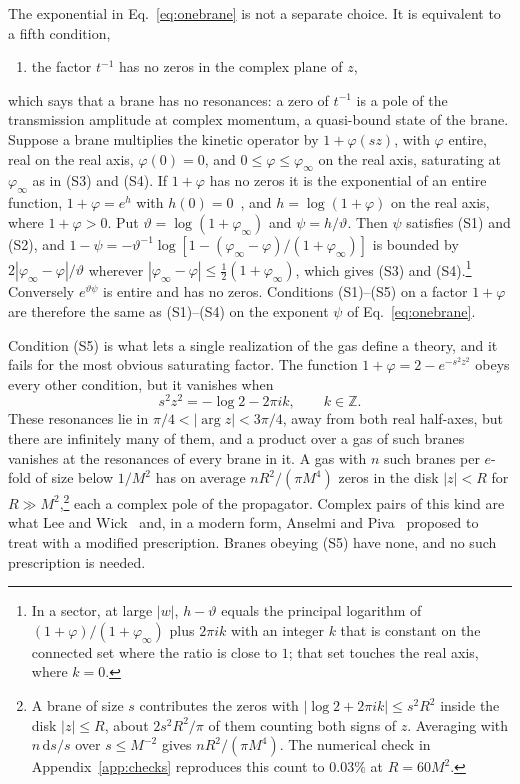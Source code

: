 \documentclass[aps,prd,10pt,twocolumn,superscriptaddress,nofootinbib,floatfix,longbibliography]{revtex4-2}
\newcommand{\dd}{\mathrm{d}}
\begin{document}
The exponential in Eq.~\eqref{eq:onebrane} is not a separate choice. It is equivalent to a fifth condition,
\begin{enumerate}[label=\textup{(S5)},leftmargin=2.4em,itemsep=0.15em]
\item the factor $t^{-1}$ has no zeros in the complex plane of $z$,
\end{enumerate}
which says that a brane has no resonances: a zero of $t^{-1}$ is a pole of the transmission amplitude at complex momentum, a quasi-bound state of the brane. Suppose a brane multiplies the kinetic operator by $1+\varphi(sz)$, with $\varphi$ entire, real on the real axis, $\varphi(0)=0$, and $0\le\varphi\le\varphi_\infty$ on the real axis, saturating at $\varphi_\infty$ as in (S3) and (S4). If $1+\varphi$ has no zeros it is the exponential of an entire function, $1+\varphi=e^{h}$ with $h(0)=0$~\cite{Titchmarsh1939}, and $h=\log(1+\varphi)$ on the real axis, where $1+\varphi>0$. Put $\vartheta=\log(1+\varphi_\infty)$ and $\psi=h/\vartheta$. Then $\psi$ satisfies (S1) and (S2), and $1-\psi=-\vartheta^{-1}\log[1-(\varphi_\infty-\varphi)/(1+\varphi_\infty)]$ is bounded by $2|\varphi_\infty-\varphi|/\vartheta$ wherever $|\varphi_\infty-\varphi|\le\frac12(1+\varphi_\infty)$, which gives (S3) and (S4).\footnote{In a sector, at large $|w|$, $h-\vartheta$ equals the principal logarithm of $(1+\varphi)/(1+\varphi_\infty)$ plus $2\pi i k$ with an integer $k$ that is constant on the connected set where the ratio is close to $1$; that set touches the real axis, where $k=0$.} Conversely $e^{\vartheta\psi}$ is entire and has no zeros. Conditions (S1)--(S5) on a factor $1+\varphi$ are therefore the same as (S1)--(S4) on the exponent $\psi$ of Eq.~\eqref{eq:onebrane}.

Condition (S5) is what lets a single realization of the gas define a theory, and it fails for the most obvious saturating factor. The function $1+\varphi=2-e^{-s^2z^2}$ obeys every other condition, but it vanishes when
\begin{equation}
\label{eq:qzeros}
s^2z^2=-\log2-2\pi ik,\qquad k\in\mathbb Z .
\end{equation}
These resonances lie in $\pi/4<|\arg z|<3\pi/4$, away from both real half-axes, but there are infinitely many of them, and a product over a gas of such branes vanishes at the resonances of every brane in it. A gas with $n$ such branes per $e$-fold of size below $1/M^2$ has on average $nR^2/(\pi M^4)$ zeros in the disk $|z|<R$ for $R\gg M^2$,\footnote{A brane of size $s$ contributes the zeros with $|\log2+2\pi ik|\le s^2R^2$ inside the disk $|z|\le R$, about $2s^2R^2/\pi$ of them counting both signs of $z$. Averaging with $n\,\dd s/s$ over $s\le M^{-2}$ gives $nR^2/(\pi M^4)$. The numerical check in Appendix~\ref{app:checks} reproduces this count to $0.03\%$ at $R=60M^2$.} each a complex pole of the propagator. Complex pairs of this kind are what Lee and Wick~\cite{LeeWick1969} and, in a modern form, Anselmi and Piva~\cite{Anselmi2017,AnselmiPiva2017} proposed to treat with a modified prescription. Branes obeying (S5) have none, and no such prescription is needed.
\end{document}
